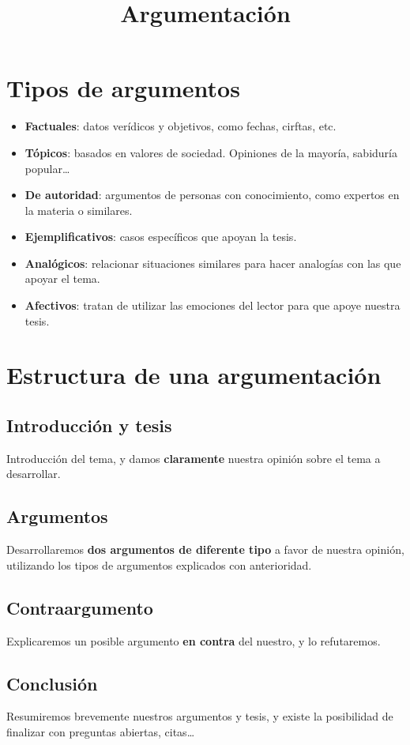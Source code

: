 \documentclass{article}
\title{Argumentación}
\date{}
\author{}
\begin{document}
\maketitle

\section*{Tipos de argumentos}
\begin{itemize}
    \item \textbf{Factuales}: datos verídicos y objetivos, como fechas, cirftas, etc.
    \item \textbf{Tópicos}: basados en valores de sociedad. Opiniones de la mayoría, sabiduría popular\dots
    \item \textbf{De autoridad}: argumentos de personas con conocimiento, como expertos en la materia o similares.
    \item \textbf{Ejemplificativos}: casos específicos que apoyan la tesis.
    \item \textbf{Analógicos}: relacionar situaciones similares para hacer analogías con las que apoyar el tema.
    \item \textbf{Afectivos}: tratan de utilizar las emociones del lector para que apoye nuestra tesis.
\end{itemize}

\section*{Estructura de una argumentación}
\subsection{Introducción y tesis}
Introducción del tema, y damos \textbf{claramente} nuestra opinión sobre el tema a desarrollar.

\subsection{Argumentos}
Desarrollaremos \textbf{dos argumentos de diferente tipo} a favor de nuestra opinión, utilizando los tipos de argumentos explicados con anterioridad.

\subsection{Contraargumento}
Explicaremos un posible argumento \textbf{en contra} del nuestro, y lo refutaremos.

\subsection{Conclusión}
Resumiremos brevemente nuestros argumentos y tesis, y existe la posibilidad de finalizar con preguntas abiertas, citas\dots
\end{document}
